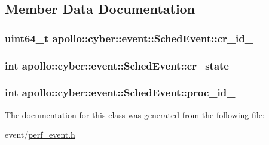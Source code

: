 \subsection{Member Data Documentation}
\hypertarget{classapollo_1_1cyber_1_1event_1_1SchedEvent_a7bae23970d3df3a25ab8f29ec5e12508}{
\subsubsection[{cr\-\_\-id\-\_\-}]{\setlength{\rightskip}{0pt plus 5cm}uint64\-\_\-t apollo\-::cyber\-::event\-::\-Sched\-Event\-::cr\-\_\-id\-\_\-\hspace{0.3cm}{\ttfamily [private]}}}\label{classapollo_1_1cyber_1_1event_1_1SchedEvent_a7bae23970d3df3a25ab8f29ec5e12508}
\hypertarget{classapollo_1_1cyber_1_1event_1_1SchedEvent_ae668da8e1cf28c3b4d59faf493b7c050}{
\subsubsection[{cr\-\_\-state\-\_\-}]{\setlength{\rightskip}{0pt plus 5cm}int apollo\-::cyber\-::event\-::\-Sched\-Event\-::cr\-\_\-state\-\_\-\hspace{0.3cm}{\ttfamily [private]}}}\label{classapollo_1_1cyber_1_1event_1_1SchedEvent_ae668da8e1cf28c3b4d59faf493b7c050}
\hypertarget{classapollo_1_1cyber_1_1event_1_1SchedEvent_aee238b5d25e30195e59a5465a1a5f23c}{
\subsubsection[{proc\-\_\-id\-\_\-}]{\setlength{\rightskip}{0pt plus 5cm}int apollo\-::cyber\-::event\-::\-Sched\-Event\-::proc\-\_\-id\-\_\-\hspace{0.3cm}{\ttfamily [private]}}}\label{classapollo_1_1cyber_1_1event_1_1SchedEvent_aee238b5d25e30195e59a5465a1a5f23c}


The documentation for this class was generated from the following file\-:\begin{DoxyCompactItemize}
\item 
event/\hyperlink{perf__event_8h}{perf\-\_\-event.\-h}\end{DoxyCompactItemize}
